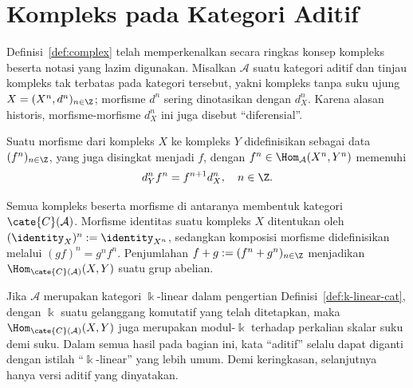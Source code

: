 
\section{Kompleks pada Kategori Aditif}\label{sec:additive-cplx}
\hypertarget{o014.aljabr2.chapter3.complexes-over-additive-categories}{ }

Definisi~\ref{def:complex} telah memperkenalkan secara ringkas konsep kompleks
beserta notasi yang lazim digunakan. Misalkan $\mathcal{A}$ suatu kategori
aditif dan tinjau kompleks tak terbatas pada kategori tersebut, yakni
kompleks tanpa suku ujung
$X=(X^n,d^n)_{n\in\Z}$; morfisme $d^n$ sering dinotasikan dengan $d_X^n$.
Karena alasan historis, morfisme-morfisme $d_X^n$ ini juga disebut
``diferensial''.

\begin{definisi}\label{def:cplx-cat}
	Suatu morfisme dari kompleks $X$ ke kompleks $Y$ didefinisikan sebagai
	data $(f^n)_{n\in\Z}$, yang juga disingkat menjadi $f$, dengan
	$f^n\in\Hom_{\mathcal{A}}(X^n,Y^n)$ memenuhi
	\[ d_Y^n f^n=f^{n+1}d_X^n,\quad n\in\Z. \]

	Semua kompleks beserta morfisme di antaranya membentuk kategori
	$\cate{C}(\mathcal{A})$. Morfisme identitas suatu kompleks $X$ ditentukan
	oleh $(\identity_X)^n:=\identity_{X^n}$, sedangkan komposisi morfisme
	didefinisikan melalui $(gf)^n=g^nf^n$. Penjumlahan
	$f+g:=(f^n+g^n)_{n\in\Z}$ menjadikan
	$\Hom_{\cate{C}(\mathcal{A})}(X,Y)$ suatu grup abelian.
\end{definisi}

Jika $\mathcal{A}$ merupakan kategori $\Bbbk$-linear dalam pengertian
Definisi~\ref{def:k-linear-cat}, dengan $\Bbbk$ suatu gelanggang komutatif
yang telah ditetapkan, maka
$\Hom_{\cate{C}(\mathcal{A})}(X,Y)$ juga merupakan modul-$\Bbbk$ terhadap
perkalian skalar suku demi suku. Dalam semua hasil pada bagian ini, kata
``aditif'' selalu dapat diganti dengan istilah ``$\Bbbk$-linear'' yang lebih
umum. Demi keringkasan, selanjutnya hanya versi aditif yang dinyatakan.

